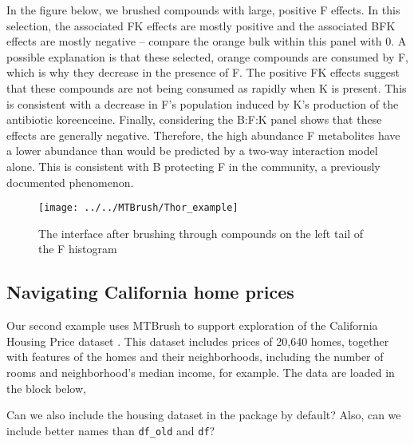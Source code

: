 In the figure below, we brushed compounds with large, positive F
effects. In this selection, the associated FK effects are mostly
positive and the associated BFK effects are mostly negative -- compare
the orange bulk within this panel with 0. A possible explanation is that
these selected, orange compounds are consumed by F, which is why they
decrease in the presence of F. The positive FK effects suggest that
these compounds are not being consumed as rapidly when K is present.
This is consistent with a decrease in F's population induced by K's
production of the antibiotic koreenceine. Finally, considering the B:F:K
panel shows that these effects are generally negative. Therefore, the
high abundance F metabolites have a lower abundance than would be
predicted by a two-way interaction model alone. This is consistent with
B protecting F in the community, a previously documented phenomenon.

\begin{Schunk}
\begin{figure}
\texttt{[image: ../../MTBrush/Thor\_example]} \caption[The interface after brushing through compounds on the left tail of the F histogram]{The interface after brushing through compounds on the left tail of the F histogram}\label{fig:unnamed-chunk-13}
\end{figure}
\end{Schunk}

\hypertarget{navigating-california-home-prices}{%
\subsection{Navigating California home
prices}\label{navigating-california-home-prices}}

Our second example uses MTBrush to support exploration of the California
Housing Price dataset \cite{housing}. This dataset includes prices of
20,640 homes, together with features of the homes and their
neighborhoods, including the number of rooms and neighborhood's median
income, for example. The data are loaded in the block below,

\color{violet}

Can we also include the housing dataset in the package by default? Also,
can we include better names than \texttt{df\_old} and \texttt{df}?
\color{black}

